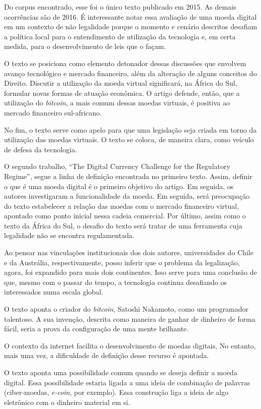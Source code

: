 \documentclass[12pt]{article}
\begin{document}
Do corpus encontrado, esse foi o único texto publicado em 2015. As demais ocorrências são de 2016. É interessante notar essa avaliação de uma moeda digital em um contexto de não legalidade porque o momento e cenário descritos desafiam a política local para o entendimento de utilização da tecnologia e, em certa medida, para o desenvolvimento de leis que o façam.

O texto se posiciona como elemento detonador dessas discussões que envolvem avanço tecnológico e mercado financeiro, além da alteração de alguns conceitos do Direito. Discutir a utilização da moeda virtual significará, na África do Sul, formular novas formas de atuação econômica. O artigo defende, então, que a utilização do \textit{bitcoin}, a mais comum dessas moedas virtuais, é positiva ao mercado financeiro sul-africano.

No fim, o texto serve como apelo para que uma legislação seja criada em torno da utilização das moedas virtuais. O texto se coloca, de maneira clara, como veículo de defesa da tecnologia.

O segundo trabalho, “The Digital Currency Challenge for the Regulatory Regime”, segue a linha de definição encontrada no primeiro texto. Assim, definir o que é uma moeda digital é o primeiro objetivo do artigo. Em seguida, os autores investigaram a funcionalidade da moeda. Em seguida, será preocupação do texto estabelecer a relação das moedas com o mercado financeiro virtual, apontado como ponto inicial nessa cadeia comercial. Por último, assim como o texto da África do Sul, o desafio do texto será tratar de uma ferramenta cuja legalidade não se encontra regulamentada.

Ao pensar nas vinculações institucionais dos dois autores, universidades do Chile e da Austrália, respectivamente, posso inferir que o problema da legalização, agora, foi expandido para mais dois continentes. Isso serve para uma conclusão de que, mesmo com o passar do tempo, a tecnologia continua desafiando os interessados numa escala global.

O texto aponta o criador do \textit{bitcoin}, Satoshi Nakamoto, como um programador talentoso. A sua invenção, descrita como maneira de ganhar de dinheiro de forma fácil, seria a prova da configuração de uma mente brilhante.

O contexto da internet facilita o desenvolvimento de moedas digitais. No entanto, mais uma vez, a dificuldade de definição desse recurso é apontada.

O texto aponta uma possibilidade comum quando se deseja definir a moeda digital. Essa possibilidade estaria ligada a uma ideia  de combinação de palavras (ciber-moedas, \textit{e-coin}, por exemplo). Essa construção liga a ideia de algo eletrônico com o dinheiro material em si. 
\end{document}
